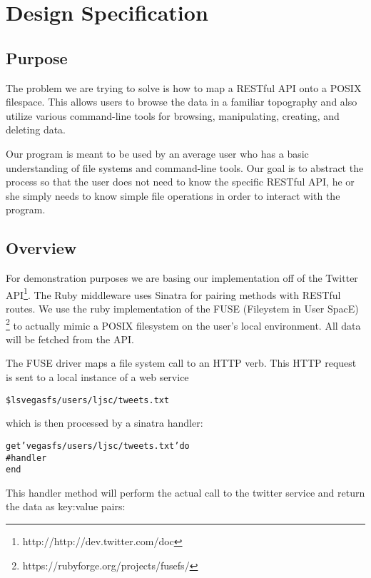 \section{Design Specification}

\subsection{Purpose}

The problem we are trying to solve is how to map a RESTful API onto a POSIX
filespace. This allows users to browse the data in a familiar topography and
also utilize various command-line tools for browsing, manipulating, creating,
and deleting data. 

Our program is meant to be used by an average user who has a basic understanding
of file systems and command-line tools. Our goal is to abstract the process so
that the user does not need to know the specific RESTful API, he or she simply
needs to know simple file operations in order to interact with the program.

\subsection{Overview}

For demonstration purposes we are basing our implementation off of the Twitter
API\footnote{http://http://dev.twitter.com/doc}. The Ruby middleware uses Sinatra
for pairing methods with RESTful routes. We use the ruby implementation of the
FUSE (Fileystem in User SpacE) \footnote{https://rubyforge.org/projects/fusefs/}
to actually mimic a POSIX filesystem on the user's local environment. All data
will be fetched from the API.

The FUSE driver maps a file system call to an HTTP verb. This HTTP request is
sent to a local instance of a web service

\begin{alltt}
    \$ ls vegasfs/users/ljsc/tweets.txt
\end{alltt} 

which is then processed by a sinatra handler:
	
\begin{alltt}
    get 'vegasfs/users/ljsc/tweets.txt' do
      #handler
    end
\end{alltt}

This handler method will perform the actual call to the twitter service and
return the data as key:value pairs: 


